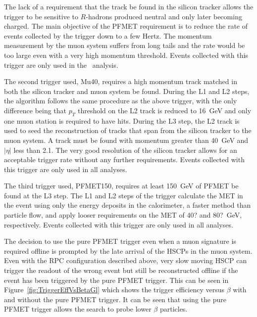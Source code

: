 The lack of a requirement that the track be found in the silicon tracker allows the trigger to be sensitive to $R$-hadrons produced neutral and only later becoming charged.
The main objective of the PFMET requirement is to reduce the rate of events collected by the trigger
down to a few Hertz. The momentum measurement by the muon system suffers from long tails and the rate would be too large even with a very high momentum threshold.
Events collected with this trigger are only used in the \muononly\ analysis.

The second trigger used, Mu40, requires a high momentum track matched in both the silicon tracker and muon system be found.
During the L1 and L2 steps, the algorithm follows the same procedure as the above trigger, with the only difference being that $p_T$ threshold on the L2 track
is reduced to 16~GeV and only one muon station is required to have hits.
During the L3 step, the L2 track is used to seed the reconstruction of tracks that span from the silicon tracker to the muon system.
A track must be found with momentum greater than 40~GeV and $|\eta|$ less than 2.1. The very good resolution of the silicon tracker allows for an acceptable trigger rate
without any further requirements. Events collected with this trigger are only used in all analyses.

The third trigger used, PFMET150, requires at least 150~GeV of PFMET be found at the L3 step. The L1 and L2 steps of the trigger calculate the MET in the event using
only the energy deposits in the calorimeter, a faster method than particle flow, and apply looser requirements on the MET of 40? and 80?~GeV, respectively.
Events collected with this trigger are only used in all analyses.

The decision to use the pure PFMET trigger even when a muon signature is required offline is prompted by the late arrival of the HSCPs in the muon system.
Even with the RPC configuration described above, very slow moving HSCP can trigger the readout of the wrong event but still be reconstructed offline
if the event has been triggered by the pure PFMET trigger. This can be seen in Figure~\ref{fig:TriggerEffVsBetaGl} which shows the trigger efficiency versus $\beta$
with and without the pure PFMET trigger.
It can be seen that using the pure PFMET trigger allows the search to probe lower $\beta$ particles. 



